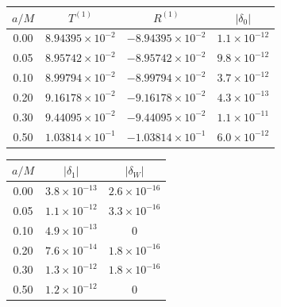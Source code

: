 \documentclass[UTF8,fontset=fandol,12pt,a4paper,oneside,openany]{ctexrep}
\begin{document}
\noindent\begin{minipage}{\linewidth}
\captionsetup{type=table}\caption{旋转趋零与 Schwarzschild 的归一化连续性比较。}\label{audit:tab:spin-limit}
\centering\fontsize{10.5}{14}\selectfont
\setlength{\tabcolsep}{6pt}\renewcommand{\arraystretch}{1.2}
\par{}\par\smallskip
\begin{tabular}{cccc}\toprule
$a/M$ & $T^{(1)}$ & $R^{(1)}$ & $|\delta_0|$\\\midrule
0.00 & $8.94395\times10^{-2}$ & $-8.94395\times10^{-2}$ & $1.1\times10^{-12}$\\
0.05 & $8.95742\times10^{-2}$ & $-8.95742\times10^{-2}$ & $9.8\times10^{-12}$\\
0.10 & $8.99794\times10^{-2}$ & $-8.99794\times10^{-2}$ & $3.7\times10^{-12}$\\
0.20 & $9.16178\times10^{-2}$ & $-9.16178\times10^{-2}$ & $4.3\times10^{-13}$\\
0.30 & $9.44095\times10^{-2}$ & $-9.44095\times10^{-2}$ & $1.1\times10^{-11}$\\
0.50 & $1.03814\times10^{-1}$ & $-1.03814\times10^{-1}$ & $6.0\times10^{-12}$\\
\bottomrule\end{tabular}
\par\medskip
\par{}\par\smallskip
\begin{tabular}{ccc}\toprule
$a/M$ & $|\delta_1|$ & $|\delta_W|$\\\midrule
0.00 & $3.8\times10^{-13}$ & $2.6\times10^{-16}$\\
0.05 & $1.1\times10^{-12}$ & $3.3\times10^{-16}$\\
0.10 & $4.9\times10^{-13}$ & $0$\\
0.20 & $7.6\times10^{-14}$ & $1.8\times10^{-16}$\\
0.30 & $1.3\times10^{-12}$ & $1.8\times10^{-16}$\\
0.50 & $1.2\times10^{-12}$ & $0$\\
\bottomrule\end{tabular}
\end{minipage}\par\addvspace{10pt}\clearpage{}
\end{document}

